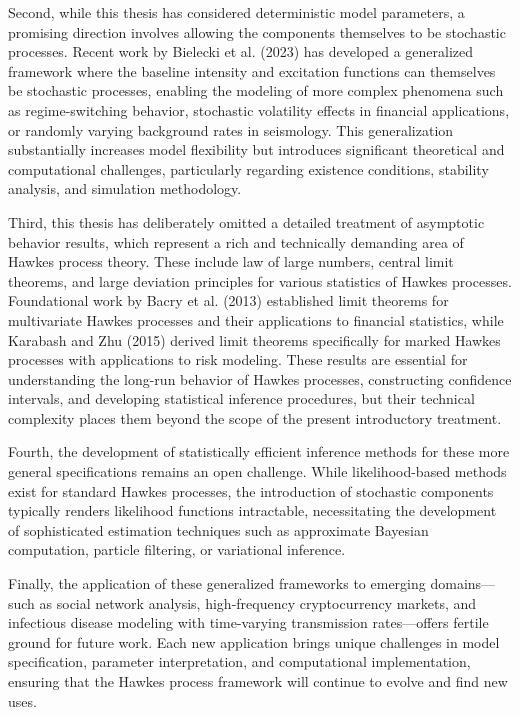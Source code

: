 \documentclass[12pt,a4paper]{report}
\theoremstyle{plain}
\theoremstyle{definition}
\theoremstyle{remark}
\newcommand{\1}{\mathbf{1}}
\begin{document}
\medskip
\noindent
Second, while this thesis has considered deterministic model parameters, a promising direction involves allowing the components themselves to be stochastic processes. Recent work by Bielecki et al. (2023) \cite{BNJ23} has developed a generalized framework where the baseline intensity and excitation functions can themselves be stochastic processes, enabling the modeling of more complex phenomena such as regime-switching behavior, stochastic volatility effects in financial applications, or randomly varying background rates in seismology. This generalization substantially increases model flexibility but introduces significant theoretical and computational challenges, particularly regarding existence conditions, stability analysis, and simulation methodology.

\medskip
\noindent
Third, this thesis has deliberately omitted a detailed treatment of asymptotic behavior results, which represent a rich and technically demanding area of Hawkes process theory. These include law of large numbers, central limit theorems, and large deviation principles for various statistics of Hawkes processes. Foundational work by Bacry et al. (2013) \cite{Bac13} established limit theorems for multivariate Hawkes processes and their applications to financial statistics, while Karabash and Zhu (2015) \cite{KZ15} derived limit theorems specifically for marked Hawkes processes with applications to risk modeling. These results are essential for understanding the long-run behavior of Hawkes processes, constructing confidence intervals, and developing statistical inference procedures, but their technical complexity places them beyond the scope of the present introductory treatment.

\medskip
\noindent
Fourth, the development of statistically efficient inference methods for these more general specifications remains an open challenge. While likelihood-based methods exist for standard Hawkes processes, the introduction of stochastic components typically renders likelihood functions intractable, necessitating the development of sophisticated estimation techniques such as approximate Bayesian computation, particle filtering, or variational inference.

\medskip
\noindent
Finally, the application of these generalized frameworks to emerging domains---such as social network analysis, high-frequency cryptocurrency markets, and infectious disease modeling with time-varying transmission rates---offers fertile ground for future work. Each new application brings unique challenges in model specification, parameter interpretation, and computational implementation, ensuring that the Hawkes process framework will continue to evolve and find new uses.
\end{document}
